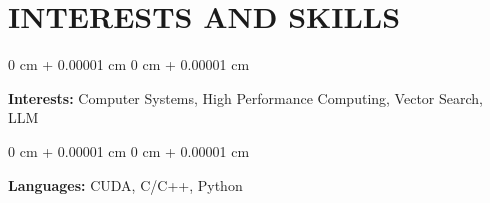 \documentclass[10pt, letterpaper]{article}
\newenvironment{highlights}{
    \begin{itemize}[
        topsep=0.10 cm,
        parsep=0.10 cm,
        partopsep=0pt,
        itemsep=0pt,
        leftmargin=0 cm + 10pt
    ]
}{
    \end{itemize}
} %
\newenvironment{onecolentry}{
    \begin{adjustwidth}{
        0 cm + 0.00001 cm
    }{
        0 cm + 0.00001 cm
    }
}{
    \end{adjustwidth}
} %
\newenvironment{twocolentry}[2][]{
    \onecolentry
    \def\secondColumn{#2}
    \setcolumnwidth{\fill, 4.5 cm}
    \begin{paracol}{2}
}{
    \switchcolumn \raggedleft \secondColumn
    \end{paracol}
    \endonecolentry
} %
\begin{document}




    
\section{INTERESTS AND SKILLS}

\begin{onecolentry}
\textbf{Interests:} Computer Systems, High Performance Computing, Vector Search, LLM
\end{onecolentry}

\vspace{0.10 cm}

\begin{onecolentry}
\textbf{Languages:} CUDA, C/C++, Python
\end{onecolentry}

\vspace{0.2 cm}



    
\end{document}
